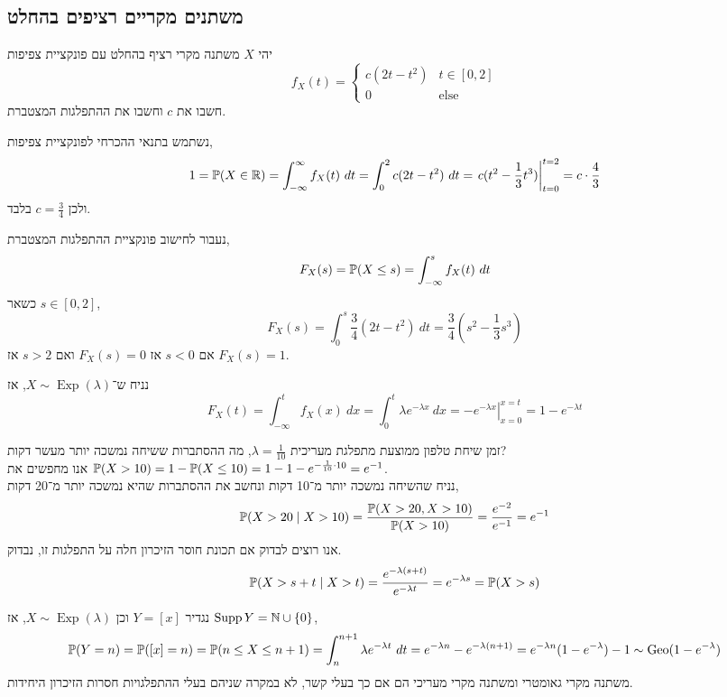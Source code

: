 \subsection{משתנים מקריים רציפים בהחלט}
\begin{exercise}
	יהי $X$ משתנה מקרי רציף בהחלט עם פונקציית צפיפות
	\[
		f_X(t) = \begin{cases}
			c(2t - t^2) & t \in [0, 2] \\
			0 & \text{else}
		\end{cases}
	\]
	חשבו את $c$ וחשבו את ההתפלגות המצטברת.
\end{exercise}
\begin{solution}
	נשתמש בתנאי ההכרחי לפונקציית צפיפות,
	\[
		1
		= \mathbb{P}(X \in \mathbb{R})
		= \int_{-\infty}^{\infty} f_X(t)\ dt
		= \int_{0}^{2} c (2t - t^2)\ dt
		= \left. c (t^2 - \frac{1}{3} t^3) \right\rvert_{t = 0}^{t = 2}
		= c \cdot \frac{4}{3}
	\]
	ולכן $c = \frac{3}{4}$ בלבד.
	
	נעבור לחישוב פונקציית ההתפלגות המצטברת,
	\[
		F_X(s)
		= \mathbb{P}(X \le s)
		= \int_{-\infty}^{s} f_X(t)\ dt
	\]
	כשאר $s \in [0, 2]$,
	\[
		F_X(s)
		= \int_{0}^{s} \frac{3}{4} (2t - t^2)\ dt
		= \frac{3}{4} (s^2 - \frac{1}{3} s^3)
	\]
	אם $s < 0$ אז $F_X(s) = 0$ ואם $s > 2$ אז $F_X(s) = 1$.
\end{solution}
\begin{example}
	נניח ש־$X \sim \operatorname{Exp}(\lambda)$, אז
	\[
		F_X(t)
		= \int_{-\infty}^{t} f_X(x)\ dx
		= \int_{0}^{t} \lambda e^{-\lambda x}\ dx
		= \left. -e^{-\lambda x} \right\rvert_{x = 0}^{x = t}
		= 1 - e^{-\lambda t}
	\]
\end{example}
\begin{example}
	זמן שיחת טלפון ממוצעת מתפלגת מעריכית $\lambda = \frac{1}{10}$, מה ההסתברות ששיחה נמשכה יותר מעשר דקות? \\
	אנו מחפשים את $\mathbb{P}(X > 10) = 1 - \mathbb{P}(X \le 10) = 1 - 1 - e^{-\frac{1}{10} \cdot 10} = e^{-1}$. \\
	נניח שהשיחה נמשכה יותר מ־10 דקות ונחשב את ההסתברות שהיא נמשכה יותר מ־20 דקות,
	\[
		\mathbb{P}(X > 20 \mid X > 10)
		= \frac{\mathbb{P}(X > 20, X > 10)}{\mathbb{P}(X > 10)}
		= \frac{e^{-2}}{e^{-1}}
		= e^{-1}
	\]
	אנו רוצים לבדוק אם תכונת חוסר הזיכרון חלה על התפלגות זו, נבדוק.
	\[
		\mathbb{P}(X > s + t \mid X > t)
		= \frac{e^{-\lambda(s + t)}}{e^{-\lambda t}}
		= e^{-\lambda s}
		= \mathbb{P}(X > s)
	\]
\end{example}
\begin{example}
	נגדיר $Y = [x]$ וכן $X \sim \operatorname{Exp}(\lambda)$, אז $\operatorname{Supp} Y = \mathbb{N} \cup \{ 0 \}$,
	\[
		\mathbb{P}(Y = n)
		= \mathbb{P}([x] = n)
		= \mathbb{P}(n \le X \le n + 1)
		= \int_{n}^{n + 1} \lambda e^{-\lambda t}\ dt
		= e^{-\lambda n} - e^{-\lambda (n + 1)}
		= e^{-\lambda n} (1 - e^{-\lambda}) - 1
		\sim \operatorname{Geo}(1 - e^{-\lambda})
	\]
	משתנה מקרי גאומטרי ומשתנה מקרי מעריכי הם אם כך בעלי קשר, לא במקרה שניהם בעלי ההתפלגויות חסרות הזיכרון היחידות.
\end{example}
